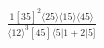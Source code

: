 \documentclass[varwidth, border=5pt]{standalone}
\begin{document}
\begin{my}
$\begin{gathered}
\scriptscriptstyle\frac{1[35]^2⟨25⟩⟨15⟩⟨45⟩}{⟨12⟩^3[45]⟨5|1+2|5]}
\end{gathered}$
\end{my}
\end{document}
